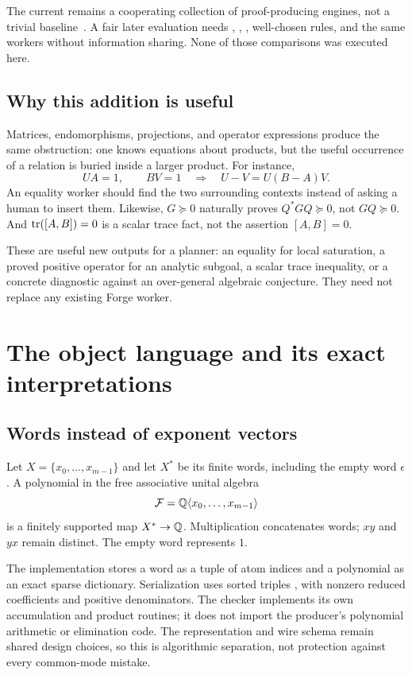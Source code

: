 The current  remains a cooperating collection of proof-producing
engines, not a trivial baseline~\cite{grind}. A fair later evaluation needs
, , , well-chosen
 rules, and the same workers without information sharing. None of
those comparisons was executed here.

\subsection{Why this addition is useful}

Matrices, endomorphisms, projections, and operator expressions produce the same
obstruction: one knows equations about products, but the useful occurrence of a
relation is buried inside a larger product. For instance,
\[
 UA=1,\qquad BV=1
 \quad\Longrightarrow\quad
 U-V=U(B-A)V.
\]
An equality worker should find the two surrounding contexts instead of asking a
human to insert them. Likewise, $G\succeq0$ naturally proves $Q^*GQ\succeq0$,
not $GQ\succeq0$. And $\operatorname{tr}([A,B])=0$ is a scalar trace fact, not the assertion
$[A,B]=0$.

These are useful new outputs for a planner: an equality for local saturation,
a proved positive operator for an analytic subgoal, a scalar trace inequality,
or a concrete diagnostic against an over-general algebraic conjecture. They
need not replace any existing Forge worker.

\section{The object language and its exact interpretations}

\subsection{Words instead of exponent vectors}

Let $X=\{x_0,\ldots,x_{m-1}\}$ and let $X^*$ be its finite words, including
the empty word $\epsilon$. A polynomial in the free associative unital algebra
\[
 \mathcal F=\mathbb Q\langle x_0,\ldots,x_{m-1}\rangle
\]
is a finitely supported map $X^*\to\mathbb Q$. Multiplication concatenates words;
$xy$ and $yx$ remain distinct. The empty word represents $1$.

The implementation stores a word as a tuple of atom indices and a polynomial as
an exact sparse dictionary. Serialization uses sorted triples
, with nonzero reduced coefficients and
positive denominators. The checker implements its own accumulation and product
routines; it does not import the producer's polynomial arithmetic or elimination
code. The representation and wire schema remain shared design choices, so this
is algorithmic separation, not protection against every common-mode mistake.

